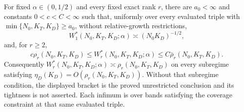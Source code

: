 For fixed \(\alpha\in(0,1/2)\) and every fixed exact rank \(r\), there are \(a_0<\infty\) and constants \(0<c<C<\infty\) such that, uniformly over every evaluated triple with \(\min\{N_0,K_T,K_D\}\ge a_0\), without relative-growth restrictions,
\[
 W_1^*(N_0,K_T,K_D;\alpha)\asymp(N_0K_D)^{-1/2},
\]
and, for \(r\ge2\),
\[
 c\rho_r(N_0,K_T,K_D)
 \le W_r^*(N_0,K_T,K_D;\alpha)
 \le C\bar\rho_r(N_0,K_T,K_D).
\]
Consequently \(W_r^*(N_0,K_T,K_D;\alpha)\asymp\rho_r(N_0,K_T,K_D)\) on every subregime satisfying \(\eta_D(K_D)=O(\rho_r(N_0,K_T,K_D))\).  Without that subregime condition, the displayed bracket is the proved unrestricted conclusion and its tightness is not asserted.  Each infimum is over bands satisfying the coverage constraint at that same evaluated triple.